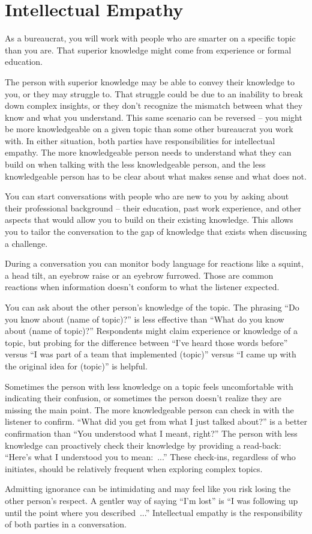 \section{Intellectual Empathy\label{sec:intellectual-empathy}}

As a bureaucrat, you will work with people who are smarter on a specific topic than you are. That superior knowledge might come from experience or formal education. 

The person with superior knowledge may be able to convey their knowledge to you, or they may struggle to. That struggle could be due to an inability to break down complex insights, or they don't recognize the mismatch between what they know and what you understand. 
This same scenario can be reversed -- you might be more knowledgeable on a given topic than some other bureaucrat you work with. In either situation, both parties have responsibilities for \gls{intellectual empathy}. The more knowledgeable person needs to understand what they can build on when talking with the less knowledgeable person, and the less knowledgeable person has to be clear about what makes sense and what does not. 

You can start conversations with people who are new to you by asking about their professional background -- their education, past work experience, and other aspects that would allow you to build on their existing knowledge. 
This allows you to tailor the conversation to the gap of knowledge that exists when discussing a challenge. 

During a conversation you can monitor body language for reactions like a squint, a head tilt, an eyebrow raise or an eyebrow furrowed. 
Those are common reactions when information doesn't conform to what the listener expected. 

You can ask about the other person's knowledge of the topic. The phrasing ``Do you know about (name of topic)?'' is less effective than ``What do you know about (name of topic)?'' 
Respondents might claim experience or knowledge of a topic, but probing for the difference between ``I've heard those words before'' versus ``I was part of a team that implemented (topic)'' versus ``I came up with the original idea for (topic)'' is helpful. 

Sometimes the person with less knowledge on a topic feels uncomfortable with indicating their confusion, or sometimes the person doesn't realize they are missing the main point. The more knowledgeable person can check in with the listener to confirm. ``What did you get from what I just talked about?'' is a better confirmation than ``You understood what I meant, right?'' The person with less knowledge can proactively check their knowledge by providing a read-back: ``Here's what I understood you to mean:~...'' These check-ins, regardless of who initiates, should be relatively frequent when exploring complex topics. 

Admitting ignorance can be intimidating and may feel like you risk losing the other person's respect. A gentler way of saying ``I'm lost'' is ``I was following up until the point where you described~...'' Intellectual empathy is the responsibility of both parties in a conversation. 


